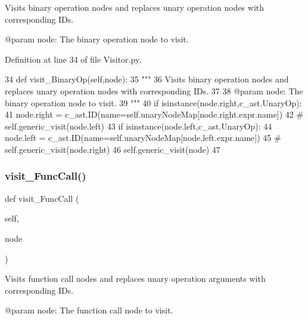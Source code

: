 \begin{DoxyVerb}Visits binary operation nodes and replaces unary operation nodes with corresponding IDs.

@param node: The binary operation node to visit.
\end{DoxyVerb}
 

Definition at line 34 of file Visitor.\+py.


\begin{DoxyCode}
34     \textcolor{keyword}{def }visit\_BinaryOp(self,node):
35         \textcolor{stringliteral}{"""
}
36 \textcolor{stringliteral}{        Visits binary operation nodes and replaces unary operation nodes with corresponding IDs.
}
37 \textcolor{stringliteral}{
}
38 \textcolor{stringliteral}{        @param node: The binary operation node to visit.
}
39 \textcolor{stringliteral}{        """}
40         \textcolor{keywordflow}{if} isinstance(node.right,c\_ast.UnaryOp):
41             node.right = c\_ast.ID(name=self.unaryNodeMap[node.right.expr.name])
42             \textcolor{comment}{# self.generic\_visit(node.left)
}
43         \textcolor{keywordflow}{if} isinstance(node.left,c\_ast.UnaryOp):
44             node.left = c\_ast.ID(name=self.unaryNodeMap[node.left.expr.name])
45             \textcolor{comment}{# self.generic\_visit(node.right)
}
46         self.generic\_visit(node)
47     
\end{DoxyCode}
\mbox{\label{classPostProcessor_1_1Visitor_1_1UnaryOpNodeChanger_a48e7baeee3968db14598ff72b6be63bd}} 
\subsubsection{\texorpdfstring{visit\+\_\+\+Func\+Call()}{visit\_FuncCall()}}
{\footnotesize\ttfamily def visit\+\_\+\+Func\+Call (\begin{DoxyParamCaption}\item[{}]{self,  }\item[{}]{node }\end{DoxyParamCaption})}

\begin{DoxyVerb}Visits function call nodes and replaces unary operation arguments with corresponding IDs.

@param node: The function call node to visit.
\end{DoxyVerb}
 

